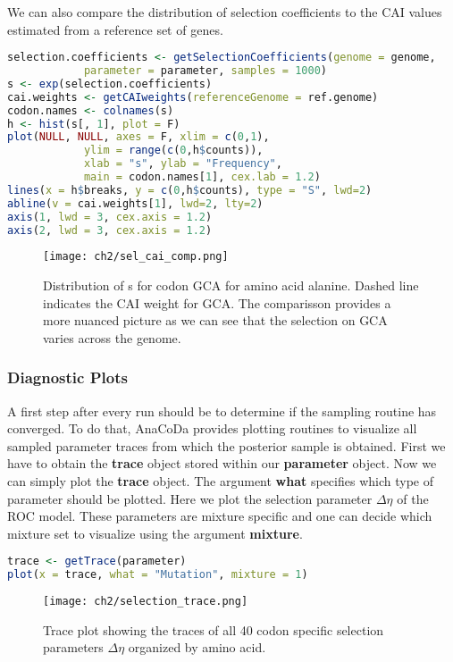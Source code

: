 We can also compare the distribution of selection coefficients to the CAI values estimated from a reference set of
genes.

\begin{lstlisting}[language=R]
selection.coefficients <- getSelectionCoefficients(genome = genome,
			parameter = parameter, samples = 1000)
s <- exp(selection.coefficients)
cai.weights <- getCAIweights(referenceGenome = ref.genome)
codon.names <- colnames(s)
h <- hist(s[, 1], plot = F)
plot(NULL, NULL, axes = F, xlim = c(0,1), 
			ylim = range(c(0,h$counts)),
			xlab = "s", ylab = "Frequency", 
			main = codon.names[1], cex.lab = 1.2)
lines(x = h$breaks, y = c(0,h$counts), type = "S", lwd=2)
abline(v = cai.weights[1], lwd=2, lty=2)
axis(1, lwd = 3, cex.axis = 1.2)
axis(2, lwd = 3, cex.axis = 1.2)
\end{lstlisting}

\begin{figure}[h]
  \centering
  \texttt{[image: ch2/sel\_cai\_comp.png]}\\
  \caption{Distribution of s for codon GCA for amino acid alanine. Dashed line indicates the CAI weight for
GCA. The comparisson provides a more nuanced picture as we can see that the selection on GCA varies
across the genome.}
  \label{fig:sne_dummy}
\end{figure} 

\subsubsection{Diagnostic Plots}
A first step after every run should be to determine if the sampling routine has converged. 
To do that, AnaCoDa provides plotting routines to visualize all sampled parameter traces from which the posterior sample is obtained.
First we have to obtain the \textbf{trace} object stored within our \textbf{parameter} object. 
Now we can simply plot the \textbf{trace} object. The argument \textbf{what} specifies which type of parameter should be plotted.
Here we plot the selection parameter $\Delta \eta$ of the ROC model. 
These parameters are mixture specific and one can decide which mixture set to visualize using the argument \textbf{mixture}.

\begin{lstlisting}[language=R]
trace <- getTrace(parameter)
plot(x = trace, what = "Mutation", mixture = 1)
\end{lstlisting}

\begin{figure}[h]
  \centering
  \texttt{[image: ch2/selection\_trace.png]}\\
  \caption{Trace plot showing the traces of all 40 codon specific selection parameters $\Delta \eta$ organized by amino acid.}
  \label{fig:mutation_trace}
\end{figure} 

